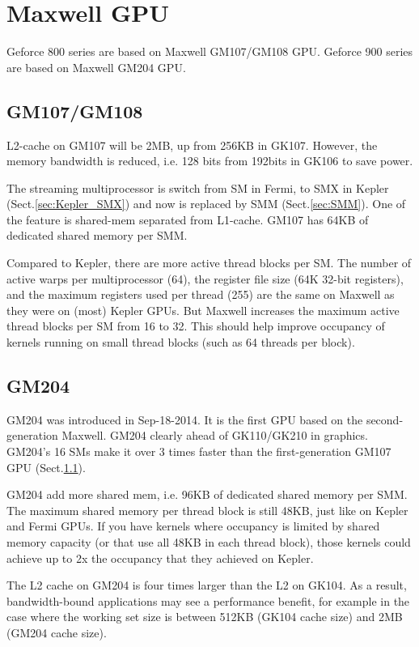 \section{Maxwell GPU}

Geforce 800 series are based on Maxwell GM107/GM108 GPU. Geforce
900 series are based on Maxwell GM204 GPU.


\subsection{GM107/GM108}
\label{sec:GM107}

L2-cache on GM107 will be 2MB, up from 256KB in GK107. However, the memory
bandwidth is reduced, i.e. 128 bits from 192bits in GK106 to save power.

The streaming multiprocessor is switch from SM in Fermi, to SMX in Kepler
(Sect.\ref{sec:Kepler_SMX}) and now is replaced by SMM (Sect.\ref{sec:SMM}).
One of the feature is shared-mem separated from L1-cache. GM107 has
64KB of dedicated shared memory per SMM.

Compared to Kepler, there are more active thread blocks per SM.
The number of active warps per multiprocessor (64), the register file size (64K
32-bit registers), and the maximum registers used per thread (255) are the same
on Maxwell as they were on (most) Kepler GPUs. But Maxwell increases the maximum
active thread blocks per SM from 16 to 32. This should help improve occupancy of
kernels running on small thread blocks (such as 64 threads per block).

\subsection{GM204}
\label{sec:GM204}

GM204 was introduced in Sep-18-2014. It is the first GPU based on the
second-generation Maxwell. GM204 clearly ahead of GK110/GK210 in graphics.
GM204's 16 SMs make it over 3 times faster than the first-generation GM107 GPU
(Sect.\ref{sec:GM107}).

GM204 add more shared mem, i.e. 96KB of dedicated shared memory per SMM.
The maximum shared memory per thread block is still 48KB, just like on Kepler
and Fermi GPUs. If you have kernels where occupancy is limited by shared memory
capacity (or that use all 48KB in each thread block), those kernels could
achieve up to 2x the occupancy that they achieved on Kepler.

The L2 cache on GM204 is four times larger than the L2 on GK104. As a result,
bandwidth-bound applications may see a performance benefit, for example in the
case where the working set size is between 512KB (GK104 cache size) and 2MB (GM204 cache size). 

